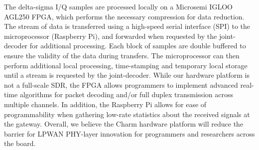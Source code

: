  The delta-sigma I/Q samples are processed
locally on a Microsemi IGLOO AGL250 FPGA, which performs the necessary
compression for data reduction.   The stream of data is transferred using a
high-speed serial interface (SPI) to the microprocessor (Raspberry Pi), and
forwarded when requested by the joint-decoder for additional processing. Each
block of samples are double buffered to ensure the validity of the data during
transfers. The microprocessor can then perform additional local processing,
time-stamping and temporary local storage until a stream is requested by the
joint-decoder. While our hardware platform is not a full-scale SDR, the FPGA
allows programmers to implement advanced real-time algorithms for packet
decoding and/or full duplex transmission across multiple channels. In
addition, the Raspberry Pi allows for ease of programmability when gathering
low-rate statistics about the received signals at the gateway. Overall, we
believe the Charm hardware platform will reduce the barrier for LPWAN
PHY-layer innovation for programmers and researchers across the board.